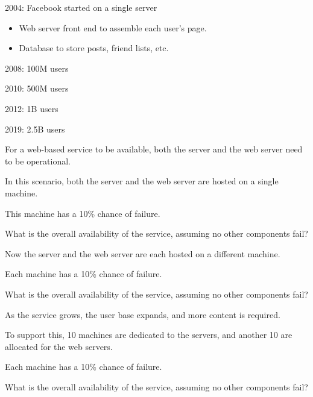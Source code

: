 \begin{slide}


    2004: Facebook started on a single server
    \begin{itemize}
        \item Web server front end to assemble each user’s page. 
        \item Database to store posts, friend lists, etc.
    \end{itemize}
    \medskip

    2008: 100M users
    \medskip

    2010: 500M users
    \medskip

    2012: 1B users
    \medskip

    2019: 2.5B users
    \medskip

\end{slide}

\begin{slide}


    For a web-based service to be available, both the server and the web server need to be operational.
    \bigskip

    In this scenario, both the server and the web server are hosted on a single machine.
    \bigskip

    This machine has a 10\% chance of failure.
    \bigskip

    What is the overall availability of the service, assuming no other components fail?

\end{slide}

\begin{slide}


    Now the server and the web server are each hosted on a different machine.
    \bigskip

    Each machine has a 10\% chance of failure.
    \bigskip

    What is the overall availability of the service, assuming no other components fail?

\end{slide}

\begin{slide}


    As the service grows, the user base expands, and more content is required.
    \bigskip

    To support this, 10 machines are dedicated to the servers, and another 10 are allocated for the web servers.
    \bigskip

    Each machine has a 10\% chance of failure.
    \bigskip

    What is the overall availability of the service, assuming no other components fail?

\end{slide}


